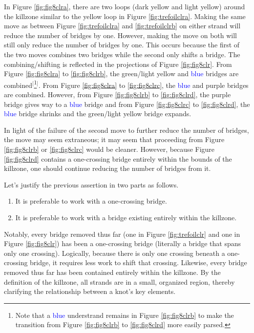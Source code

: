 \documentclass[titlepage,11pt]{article}
\begin{document}
In Figure \ref{fig:fig8clra}, there are two loops (\textcolor{yly}{dark yellow} and \textcolor{ylz}{light yellow}) around the killzone similar to the \textcolor{ylx}{yellow} loop in Figure \ref{fig:trefoilclra}. Making the same move as between Figure \ref{fig:trefoilclra} and \ref{fig:trefoilclrb} on either strand will reduce the number of bridges by one. However, making the move on both will still only reduce the number of bridges by one. This occurs because the first of the two moves combines two bridges while the second only shifts a bridge. The combining/shifting is reflected in the projections of Figure \ref{fig:fig8clr}. From Figure \ref{fig:fig8clra} to \ref{fig:fig8clrb}, the \textcolor{grx}{green}/\textcolor{ylz}{light yellow} and \textcolor{blue}{blue} bridges are combined$^[$\footnote{Note that a \textcolor{blue}{blue} understrand remains in Figure \ref{fig:fig8clrb} to make the transition from Figure \ref{fig:fig8clrb} to \ref{fig:fig8clrd} more easily parsed.}$^]$. From Figure \ref{fig:fig8clra} to \ref{fig:fig8clrc}, the \textcolor{blue}{blue} and \textcolor{pux}{purple} bridges are combined. However, from Figure \ref{fig:fig8clrb} to \ref{fig:fig8clrd}, the \textcolor{pux}{purple} bridge gives way to a \textcolor{blue}{blue} bridge and from Figure \ref{fig:fig8clrc} to \ref{fig:fig8clrd}, the \textcolor{blue}{blue} bridge shrinks and the \textcolor{grx}{green}/\textcolor{ylz}{light yellow} bridge expands.\par
In light of the failure of the second move to further reduce the number of bridges, the move may seem extraneous; it may seem that proceeding from Figure \ref{fig:fig8clrb} or \ref{fig:fig8clrc} would be cleaner. However, because Figure \ref{fig:fig8clrd} contains a one-crossing bridge entirely within the bounds of the killzone, one should continue reducing the number of bridges from it.\par
Let's justify the previous assertion in two parts as follows.

\begin{conj}
    \begin{enumerate}
        \item It is preferable to work with a one-crossing bridge.
        \item It is preferable to work with a bridge existing entirely within the killzone.
    \end{enumerate}
\end{conj}

Notably, every bridge removed thus far (one in Figure \ref{fig:trefoilclr} and one in Figure \ref{fig:fig8clr}) has been a one-crossing bridge (literally a bridge that spans only one crossing). Logically, because there is only one crossing beneath a one-crossing bridge, it requires less work to shift that crossing. Likewise, every bridge removed thus far has been contained entirely within the killzone. By the definition of the killzone, all strands are in a small, organized region, thereby clarifying the relationship between a knot's key elements.
\end{document}
